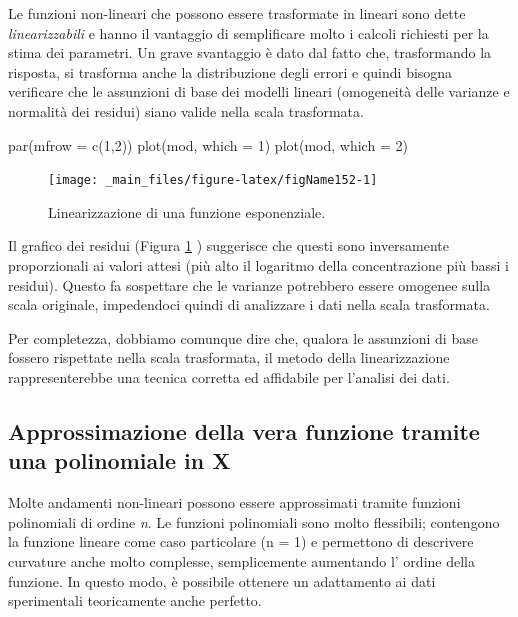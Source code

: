 \documentclass[a4paper,12pt,oneside]{book}
\newenvironment{Shaded}{\begin{snugshade}}{\end{snugshade}}
\newcommand{\DecValTok}[1]{#1}
\newcommand{\FunctionTok}[1]{#1}
\newcommand{\AttributeTok}[1]{#1}
\newcommand{\NormalTok}[1]{#1}
\begin{document}
Le funzioni non-lineari che possono essere trasformate in lineari sono dette \emph{linearizzabili} e hanno il vantaggio di semplificare molto i calcoli richiesti per la stima dei parametri. Un grave svantaggio è dato dal fatto che, trasformando la risposta, si trasforma anche la distribuzione degli errori e quindi bisogna verificare che le assunzioni di base dei modelli lineari (omogeneità delle varianze e normalità dei residui) siano valide nella scala trasformata.

\begin{Shaded}
\begin{Highlighting}[]
\FunctionTok{par}\NormalTok{(}\AttributeTok{mfrow =} \FunctionTok{c}\NormalTok{(}\DecValTok{1}\NormalTok{,}\DecValTok{2}\NormalTok{))}
\FunctionTok{plot}\NormalTok{(mod, }\AttributeTok{which =} \DecValTok{1}\NormalTok{)}
\FunctionTok{plot}\NormalTok{(mod, }\AttributeTok{which =} \DecValTok{2}\NormalTok{)}
\end{Highlighting}
\end{Shaded}

\begin{figure}

{\centering \texttt{[image: \_main\_files/figure-latex/figName152-1]} 

}

\caption{Linearizzazione di una funzione esponenziale.}\label{fig:figName152}
\end{figure}

Il grafico dei residui (Figura \ref{fig:figName152} ) suggerisce che questi sono inversamente proporzionali ai valori attesi (più alto il logaritmo della concentrazione più bassi i residui). Questo fa sospettare che le varianze potrebbero essere omogenee sulla scala originale, impedendoci quindi di analizzare i dati nella scala trasformata.

Per completezza, dobbiamo comunque dire che, qualora le assunzioni di base fossero rispettate nella scala trasformata, il metodo della linearizzazione rappresenterebbe una tecnica corretta ed affidabile per l'analisi dei dati.

\hypertarget{approssimazione-della-vera-funzione-tramite-una-polinomiale-in-x}{%
\subsection{Approssimazione della vera funzione tramite una polinomiale in X}\label{approssimazione-della-vera-funzione-tramite-una-polinomiale-in-x}}

Molte andamenti non-lineari possono essere approssimati tramite funzioni polinomiali di ordine \textit{n}. Le funzioni polinomiali sono molto flessibili; contengono la funzione lineare come caso particolare (n = 1) e permettono di descrivere curvature anche molto complesse, semplicemente aumentando l' ordine della funzione. In questo modo, è possibile ottenere un adattamento ai dati sperimentali teoricamente anche perfetto.
\end{document}
